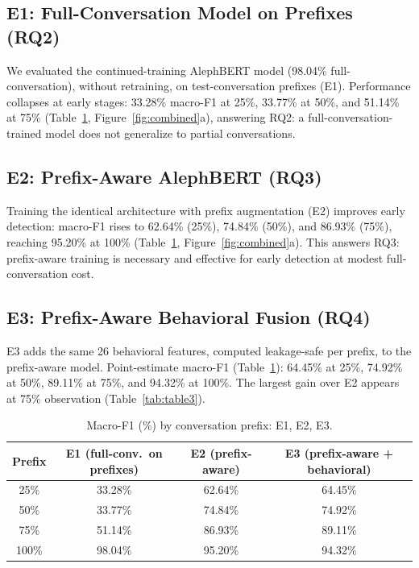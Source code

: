 \documentclass{article}
\begin{document}
\subsection{E1: Full-Conversation Model on Prefixes (RQ2)}
\label{sec:e1}

We evaluated the continued-training AlephBERT model (98.04\% full-conversation), without retraining, on test-conversation prefixes (E1). Performance collapses at early stages: 33.28\% macro-F1 at 25\%, 33.77\% at 50\%, and 51.14\% at 75\% (Table~\ref{tab:table2}, Figure~\ref{fig:combined}a), answering RQ2: a full-conversation-trained model does not generalize to partial conversations.

\subsection{E2: Prefix-Aware AlephBERT (RQ3)}
\label{sec:e2}

Training the identical architecture with prefix augmentation (E2) improves early detection: macro-F1 rises to 62.64\% (25\%), 74.84\% (50\%), and 86.93\% (75\%), reaching 95.20\% at 100\% (Table~\ref{tab:table2}, Figure~\ref{fig:combined}a). This answers RQ3: prefix-aware training is necessary and effective for early detection at modest full-conversation cost.

\subsection{E3: Prefix-Aware Behavioral Fusion (RQ4)}
\label{sec:e3}

E3 adds the same 26 behavioral features, computed leakage-safe per prefix, to the prefix-aware model. Point-estimate macro-F1 (Table~\ref{tab:table2}): 64.45\% at 25\%, 74.92\% at 50\%, 89.11\% at 75\%, and 94.32\% at 100\%. The largest gain over E2 appears at 75\% observation (Table~\ref{tab:table3}).

\begin{table}[htbp]
\centering
\small
\begin{tabular}{@{}cccc@{}}
\toprule
Prefix & E1 (full-conv.\ on prefixes) & E2 (prefix-aware) & E3 (prefix-aware + behavioral) \\
\midrule
25\%  & 33.28\% & 62.64\% & 64.45\% \\
50\%  & 33.77\% & 74.84\% & 74.92\% \\
75\%  & 51.14\% & 86.93\% & 89.11\% \\
100\% & 98.04\% & 95.20\% & 94.32\% \\
\bottomrule
\end{tabular}
\caption{Macro-F1 (\%) by conversation prefix: E1, E2, E3.}
\label{tab:table2}
\end{table}
\end{document}
